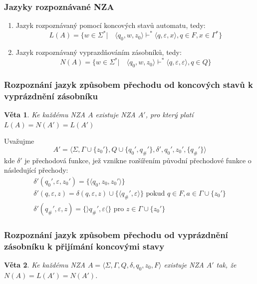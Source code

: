 \documentclass[10pt,a4paper]{article}
\theoremstyle{note}
\newtheorem{veta}{Věta}
\begin{document}
\subsubsection{Jazyky rozpoznávané NZA}
\begin{enumerate}
\item
Jazyk rozpoznávaný pomocí koncových stavů automatu, tedy:
$$
L(A) = \lbrace w \in \Sigma^* | \quad \langle q_0, w, z_0 \rangle \vdash^* \langle q, \varepsilon, x \rangle, q \in F, x \in \Gamma^* \rbrace
$$

\item
Jazyk rozpoznávaný vyprazdňováním zásobníků, tedy:
$$
N(A) = \lbrace w \in \Sigma^* | \quad \langle q_0, w, z_0 \rangle \vdash^* \langle q, \varepsilon, \varepsilon \rangle, q \in Q \rbrace
$$
\end{enumerate}

\subsubsection{Rozpoznání jazyk způsobem přechodu od koncových stavů k vyprázdnění zásobníku}
\begin{veta}
Ke každému NZA $A$ existuje NZA $A'$, pro který platí $L(A) = N(A') = L(A')$
\end{veta}


Uvažujme
$$
A' = \langle \Sigma, \Gamma \cup \lbrace z_{0}' \rbrace, Q \cup \lbrace q_{0}', q_{\#}' \rbrace, \delta',
q_0', z_0', \lbrace q_{\#}' \rbrace \rangle
$$
kde $\delta'$ je přechodová funkce, jež vznikne rozšířením původní přechodové funkce o následující přechody:
\begin{gather*}
\delta'(q_0', \varepsilon, z_0') = \lbrace \langle q_0, z_0, z_0' \rangle \rbrace \\
\delta'(q, \varepsilon, z) = \delta(q, \varepsilon, z) \cup \lbrace \langle q_{\#}', \varepsilon \rangle \rbrace \text { pokud }
q \in F, a \in \Gamma \cup \lbrace z_0' \rbrace \\
\delta'(q_{\#}', \varepsilon, z) = \lbrace \rangle q_{\#}', \varepsilon \langle \rbrace \text{ pro } z \in \Gamma \cup \lbrace z_0' \rbrace
\end{gather*}

\subsubsection{Rozpoznání jazyk způsobem přechodu od vyprázdnění zásobníku k přijímání koncovými stavy}
\begin{veta}
Ke každému NZA $A = \langle \Sigma, \Gamma, Q, \delta, q_0, z_0, F \rangle$ existuje NZA $A'$ tak, že $N(A) = L(A') = N(A')$.
\end{veta}
\end{document}
